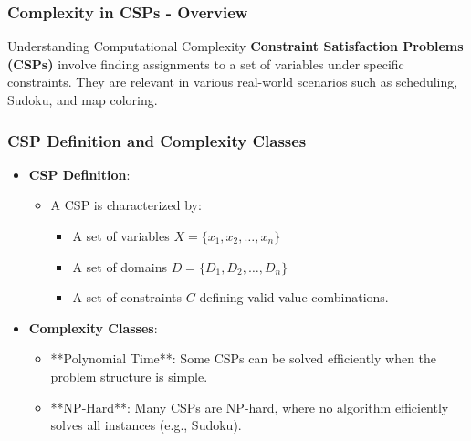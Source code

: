 \documentclass[aspectratio=169]{beamer}
\begin{document}
\begin{frame}[fragile]
    \frametitle{Complexity in CSPs - Overview}
    \begin{block}{Understanding Computational Complexity}
        \textbf{Constraint Satisfaction Problems (CSPs)} involve finding assignments to a set of variables under specific constraints. They are relevant in various real-world scenarios such as scheduling, Sudoku, and map coloring.
    \end{block}
\end{frame}

\begin{frame}[fragile]
    \frametitle{CSP Definition and Complexity Classes}
    \begin{itemize}
        \item \textbf{CSP Definition}:
        \begin{itemize}
            \item A CSP is characterized by:
            \begin{itemize}
                \item A set of variables \(X = \{x_1, x_2, \ldots, x_n\}\)
                \item A set of domains \(D = \{D_1, D_2, \ldots, D_n\}\)
                \item A set of constraints \(C\) defining valid value combinations.
            \end{itemize}
        \end{itemize}
        
        \item \textbf{Complexity Classes}:
        \begin{itemize}
            \item **Polynomial Time**: Some CSPs can be solved efficiently when the problem structure is simple.
            \item **NP-Hard**: Many CSPs are NP-hard, where no algorithm efficiently solves all instances (e.g., Sudoku).
        \end{itemize}
    \end{itemize}
\end{frame}
\end{document}
